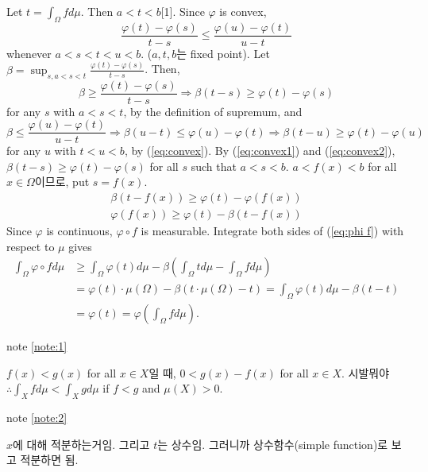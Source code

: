 \documentclass[11pt,reqno]{article}
\renewcommand{\(}{\left(}
\renewcommand{\)}{\right)}
\renewcommand{\[}{\left[}
\renewcommand{\]}{\right]}
\newenvironment{note}
  {\begin{tcolorbox}[
    colback=white, 
    colframe=gray!50, 
    boxrule=0.5pt,
    fontupper=\normalfont
  ]}
  {\end{tcolorbox}}
\begin{document}
Let $t = \int_\Omega f d\mu$. Then $a < t < b$[1\label{note:1}].
Since $\varphi$ is convex,
\begin{equation} \label{eq:convex}
  \frac{\varphi (t) - \varphi (s)}{t-s} \le \frac{\varphi (u) - \varphi (t)}{u-t}
\end{equation}
whenever $a < s < t < u < b$. ($a, t, b$는 fixed point).
Let $\beta = \sup_{s, a<s<t} \frac{\varphi (t) - \varphi (s)}{t-s}$. Then,
\begin{equation} \label{eq:convex1}
  \beta \ge \frac{\varphi (t) - \varphi (s)}{t-s} \Rightarrow \beta (t - s) \ge \varphi (t) - \varphi (s)
\end{equation} for any $s$ with $a<s<t$, by the definition of supremum, and
\begin{equation} \label{eq:convex2}
  \beta \le \frac{\varphi (u) - \varphi (t)}{u-t} \Rightarrow \beta (u - t) \le \varphi (u) - \varphi (t) \Rightarrow \beta (t - u) \ge \varphi (t) - \varphi (u)
\end{equation} for any $u$ with $t < u < b$, by (\ref{eq:convex}).
By (\ref{eq:convex1}) and (\ref{eq:convex2}), $\beta (t - s) \ge \varphi (t) - \varphi (s)$ for all $s$ such that $a < s < b$.
$a < f(x) < b$ for all $x \in \Omega$이므로, put $s = f(x)$.
\begin{align} \label{eq:phi f}
  \beta (t - f(x)) \ge \varphi (t) - \varphi (f(x)) \\
  \varphi (f(x)) \ge \varphi (t) - \beta (t - f(x))
\end{align}
Since $\varphi$ is continuous, $\varphi \circ f$ is measurable.
Integrate both sides of (\ref{eq:phi f}) with respect to $\mu$ gives
\begin{align}
  \int_\Omega \varphi \circ f d\mu &\ge \int_\Omega \varphi(t) d\mu - \beta \(\int_\Omega t d\mu - \int_\Omega f d\mu\) \\
  &= \varphi(t) \cdot \mu(\Omega) - \beta( t \cdot \mu(\Omega) - t) = \int_\Omega \varphi(t) d\mu - \beta(t - t) \label{note:2} \\
  &= \varphi(t) = \varphi \(\int_\Omega f d\mu\).
\end{align}

\begin{note}
  note \ref{note:1}

  $f(x) < g(x)$ for all $x \in X$일 때, $0 < g(x) - f(x)$ for all $x \in X$.
  시발뭐야
  $\therefore \int_X f d\mu < \int_X g d\mu$ if $f < g$ and $\mu(X) > 0$.

\end{note}

\begin{note}
  note \ref{note:2}

  $x$에 대해 적분하는거임. 그리고 $t$는 상수임. 그러니까 상수함수(simple function)로 보고 적분하면 됨.
\end{note}
\end{document}
